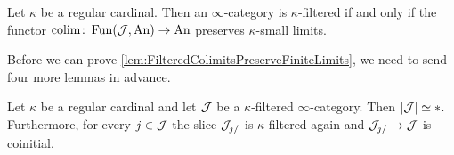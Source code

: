 \begin{thm}\label{lem:FilteredColimitsPreserveFiniteLimits}
	Let $\kappa$ be a regular cardinal. Then an $\infty$-category is $\kappa$-filtered if and only if the functor $\operatorname*{colim}\colon \operatorname{Fun}(\mathcal{J},\mathrm{An})\rightarrow\mathrm{An}$ preserves $\kappa$-small limits.
\end{thm}
Before we can prove \cref{lem:FilteredColimitsPreserveFiniteLimits}, we need to send four more lemmas in advance.%
\begin{lem}\label{lem:FilteredCofinal}
	Let $\kappa$ be a regular cardinal and let $\mathcal{J}$ be a $\kappa$-filtered $\infty$-category. Then $\abs*{\Jj}\simeq *$. Furthermore, for every $j\in\mathcal{J}$ the slice $\mathcal{J}_{j/}$ is $\kappa$-filtered again and $\mathcal{J}_{j/}\rightarrow \mathcal{J}$ is coinitial.
\end{lem}

